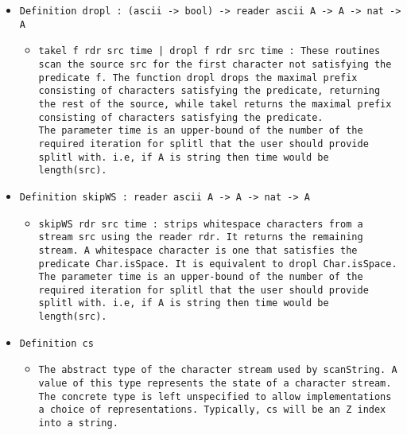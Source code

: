 \documentclass[11pt]{report}
\begin{document}
\begin{itemize}
\item  \texttt{Definition dropl : (ascii -> bool) -> reader ascii A -> A -> nat -> A}

\begin{itemize}
\item  \begin{flushleft}  \texttt{takel f rdr src time | dropl f rdr src time : These routines scan the source src for the first character not satisfying the predicate f. The function dropl drops the maximal prefix consisting of characters satisfying the predicate, returning the rest of the source, while takel returns the maximal prefix consisting of characters satisfying the predicate.\\
\coqdocemptyline
The parameter time is an upper-bound of the number of the required iteration for splitl that the user should provide splitl with. i.e, if A is string then time would be length(src).} \end{flushleft}
\end{itemize}

\item  \texttt{Definition skipWS : reader ascii A -> A -> nat -> A}

\begin{itemize}
\item  \begin{flushleft} \texttt{skipWS rdr src time : strips whitespace characters from a stream src using the reader rdr. It returns the remaining stream. A whitespace character is one that satisfies the predicate Char.isSpace. It is equivalent to dropl Char.isSpace.\\
\coqdocemptyline
The parameter time is an upper-bound of the number of the required iteration for splitl that the user should provide splitl with. i.e, if A is string then time would be length(src).} \end{flushleft}



\end{itemize}

\item  \texttt{Definition cs}

\begin{itemize}
\item  \texttt{The abstract type of the character stream used by scanString. A value of this type represents the state of a character stream. The concrete type is left unspecified to allow implementations a choice of representations. Typically, cs will be an Z index into a string.}




\end{itemize}
\end{itemize}
\end{document}
